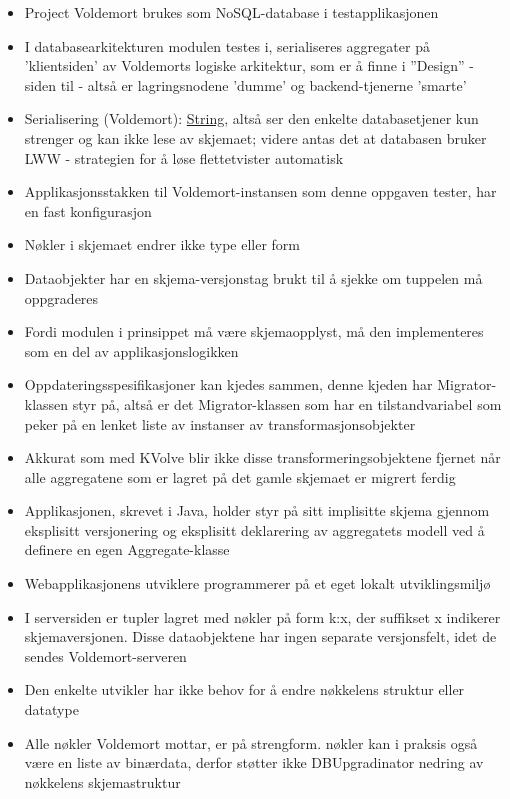 \begin{itemize}
  \item Project Voldemort brukes som NoSQL-database i testapplikasjonen
  \item I databasearkitekturen modulen testes i, serialiseres aggregater på 'klientsiden' av Voldemorts logiske arkitektur, som er å finne i ''Design'' - siden til \cite{kreps2009} - altså er lagringsnodene 'dumme' og backend-tjenerne 'smarte'
  \item Serialisering (Voldemort): \underline{String}, altså ser den enkelte databasetjener kun strenger og kan ikke lese av skjemaet; videre antas det at databasen bruker LWW - strategien for å løse flettetvister automatisk
  \item Applikasjonsstakken til Voldemort-instansen som denne oppgaven tester, har en fast konfigurasjon
  \item Nøkler i skjemaet endrer ikke type eller form
  \item Dataobjekter har en skjema-versjonstag brukt til å sjekke om tuppelen må oppgraderes
  \item Fordi modulen i prinsippet må være skjemaopplyst, må den implementeres som en del av applikasjonslogikken
  \item Oppdateringsspesifikasjoner kan kjedes sammen, denne kjeden har Migrator-klassen styr på, altså er det Migrator-klassen som har en tilstandvariabel som peker på en lenket liste av instanser av transformasjonsobjekter
  \item Akkurat som med KVolve blir ikke disse transformeringsobjektene fjernet når alle aggregatene som er lagret på det gamle skjemaet er migrert ferdig
  \item Applikasjonen, skrevet i Java, holder styr på sitt implisitte skjema gjennom eksplisitt versjonering og eksplisitt deklarering av aggregatets modell ved å definere en egen Aggregate-klasse
  \item Webapplikasjonens utviklere programmerer på et eget lokalt utviklingsmiljø
  \item I serversiden er tupler lagret med nøkler på form k:x, der suffikset x indikerer skjemaversjonen. Disse dataobjektene har ingen separate versjonsfelt, idet de sendes Voldemort-serveren
  \item Den enkelte utvikler har ikke behov for å endre nøkkelens struktur eller datatype
  \item Alle nøkler Voldemort mottar, er på strengform. nøkler kan i praksis også være en liste av binærdata, derfor støtter ikke DBUpgradinator nedring av nøkkelens skjemastruktur

\end{itemize}
